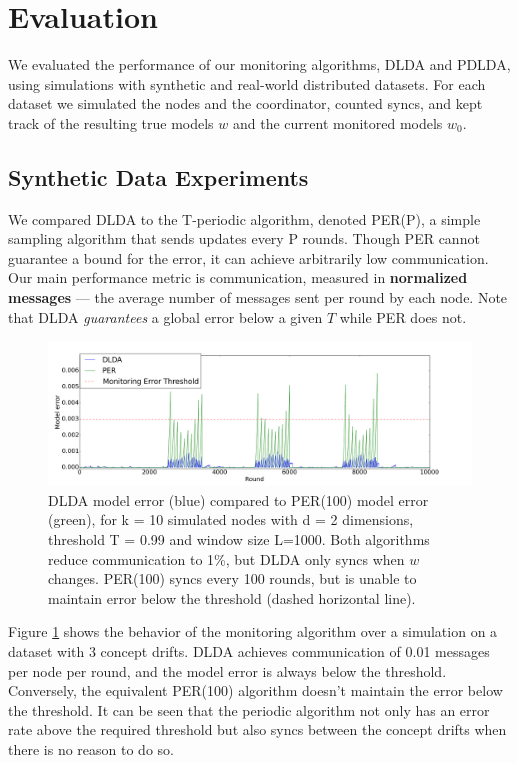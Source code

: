 \documentclass{sig-alternate-05-2015}
\begin{document}
\section{Evaluation}
We evaluated the performance of our monitoring algorithms,
DLDA and PDLDA, using simulations with synthetic and real-world 
distributed datasets. For each dataset we simulated the nodes and the coordinator, 
counted syncs, and kept track of the resulting true models $w$ and the
current monitored models $w_0$. 
\subsection{Synthetic Data Experiments}
We compared DLDA to the T-periodic algorithm, denoted
PER(P), a simple sampling algorithm that sends updates
every P rounds. Though PER cannot guarantee a bound for the
error, it can achieve arbitrarily low communication.
Our main performance metric is communication, measured
in \textbf{normalized messages} --- the average number of messages sent per
round by each node. Note that DLDA \textit{guarantees}
a global error below a given $T$ while PER does not.

\begin{figure}[ht]
	\centering
	\includegraphics[width=\textwidth]{PER/PERvsDLDAoverTime.png}
	\caption{ DLDA model error (blue) compared to PER(100) model error (green), 
	for k = 10 simulated nodes with d = 2 dimensions, threshold T = 0.99 and
	window size L=1000. Both algorithms reduce communication to 1\%, but DLDA
	only syncs when $w$ changes. PER(100) syncs every 100 rounds, 
	but is unable to maintain error below the threshold (dashed horizontal line).}
	\label{PERvsDLDAoverTime}
\end{figure}
	
Figure \ref{PERvsDLDAoverTime} shows the behavior of the monitoring 
algorithm over a simulation on a dataset with 3 concept drifts. 
DLDA achieves communication of 0.01 messages per node per round, and 
the model error is always below the threshold. 
Conversely, the equivalent PER(100) algorithm doesn't maintain the
error below the threshold. It can be seen that the periodic algorithm 
not only has an error rate above the required threshold but also
syncs between the concept drifts when there is no reason to do so.
\end{document}
